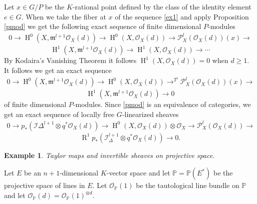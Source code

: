 \documentclass{amsart}
\theoremstyle{plain}
\newtheorem{example}[theorem]{Example}
\theoremstyle{definition}
\theoremstyle{remark}
\numberwithin{equation}{theorem}
\begin{document}
Let $x\in G/P$ be the $K$-rational point defined by the class of the
identity element $e\in G$.  When we take the fiber at $x$ of the sequence \ref{ex1} and apply
Proposition \ref{pmod} we get the following exact sequence of finite
dimensional $P$-modules
\begin{align} \label{fiber1}
0\rightarrow {\operatorname{H} }^0(X,{\mathfrak{m}}^{l+1}{\mathcal{O} }_X(d))\rightarrow {\operatorname{H} }^0(X,{\mathcal{O} }_X(d))\rightarrow
{\mathcal{P} }^l_X({\mathcal{O} }_X(d))(x)\rightarrow 
\end{align}
\[ {\operatorname{H} }^1(X,{\mathfrak{m}}^{l+1}{\mathcal{O} }_X(d))\rightarrow {\operatorname{H} }^1(X,{\mathcal{O} }_X(d)) \rightarrow \cdots
\]
By Kodaira's Vanishing Theorem it follows ${\operatorname{H} }^1(X,{\mathcal{O} }_X(d))=0$ when $d\geq
1$. It follows we get an exact sequence
\begin{align} \label{fiber2}
0\rightarrow {\operatorname{H} }^0(X,{\mathfrak{m}}^{l+1}{\mathcal{O} }_X(d))\rightarrow {\operatorname{H} }^0(X,{\mathcal{O} }_X(d))\rightarrow^{T^l}
{\mathcal{P} }^l_X({\mathcal{O} }_X(d))(x)\rightarrow
\end{align}
\[ {\operatorname{H} }^1(X,{\mathfrak{m}}^{l+1}{\mathcal{O} }_X(d))\rightarrow 0 \]
of finite dimensional $P$-modules.
Since \ref{pmod} is an equivalence of categories, we get an exact
sequence of locally free $G$-linearized sheaves
\begin{align} \label{ex2}0\rightarrow p_*({\mathcal{I}}\Delta^{l+1}\otimes
  q^*{\mathcal{O} }_X(d))\rightarrow {\operatorname{H} }^0(X,{\mathcal{O} }_X(d))\otimes {\mathcal{O} }_X 
\rightarrow {\mathcal{P} }^l_X({\mathcal{O} }_X(d)) \rightarrow \end{align}
\[ {\operatorname{R} }^1p_*({\mathcal{I}}_\Delta^{l+1}\otimes q^*{\mathcal{O} }_X(d))\rightarrow 0 .\]

\begin{example} Taylor maps and invertible sheaves on projective space.\end{example}

Let $E$ be an $n+1$-dimensional $K$-vector space and let
${\mathbb{P}}={\mathbb{P}}(E^*)$ be the projective space of lines in $E$. Let ${\mathcal{O} }_{\mathbb{P}}(1)$
be the tautological line bundle on ${\mathbb{P}}$ and let ${\mathcal{O} }_{\mathbb{P}}(d)={\mathcal{O} }_{\mathbb{P}}(1)^{\otimes d}$. 
\end{document}
